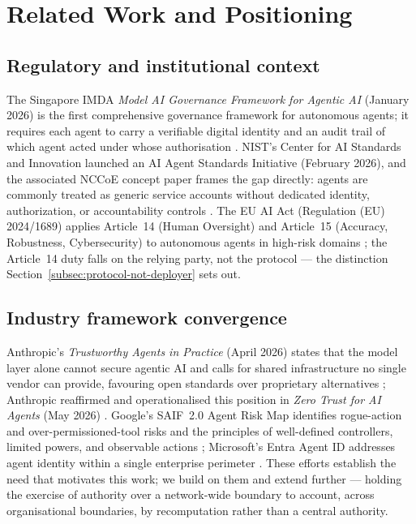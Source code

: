 \section{Related Work and Positioning}
\label{sec:related}

\subsection{Regulatory and institutional context}

The Singapore IMDA \textit{Model AI Governance Framework for Agentic AI} (January 2026) is the first comprehensive governance framework for autonomous agents; it requires each agent to carry a verifiable digital identity and an audit trail of which agent acted under whose authorisation \cite{ref8_imda,ref21_imdafull}. NIST's Center for AI Standards and Innovation launched an AI Agent Standards Initiative (February 2026), and the associated NCCoE concept paper frames the gap directly: agents are commonly treated as generic service accounts without dedicated identity, authorization, or accountability controls \cite{ref9_nistcaisi,ref10_nccoe,ref22_cosais}. The EU AI Act (Regulation (EU) 2024/1689) applies Article~14 (Human Oversight) and Article~15 (Accuracy, Robustness, Cybersecurity) to autonomous agents in high-risk domains \cite{ref23_euaiact}; the Article~14 duty falls on the relying party, not the protocol — the distinction Section~\ref{subsec:protocol-not-deployer} sets out.

\subsection{Industry framework convergence}

Anthropic's \textit{Trustworthy Agents in Practice} (April 2026) states that the model layer alone cannot secure agentic AI and calls for shared infrastructure no single vendor can provide, favouring open standards over proprietary alternatives \cite{ref11_anthropic}; Anthropic reaffirmed and operationalised this position in \textit{Zero Trust for AI Agents} (May 2026) \cite{ref58_anthropic_zerotrust}. Google's SAIF~2.0 Agent Risk Map identifies rogue-action and over-permissioned-tool risks and the principles of well-defined controllers, limited powers, and observable actions \cite{ref12_google,ref24_cosai}; Microsoft's Entra Agent ID addresses agent identity within a single enterprise perimeter \cite{ref25_entra}. These efforts establish the need that motivates this work; we build on them and extend further — holding the exercise of authority over a network-wide boundary to account, across organisational boundaries, by recomputation rather than a central authority.

